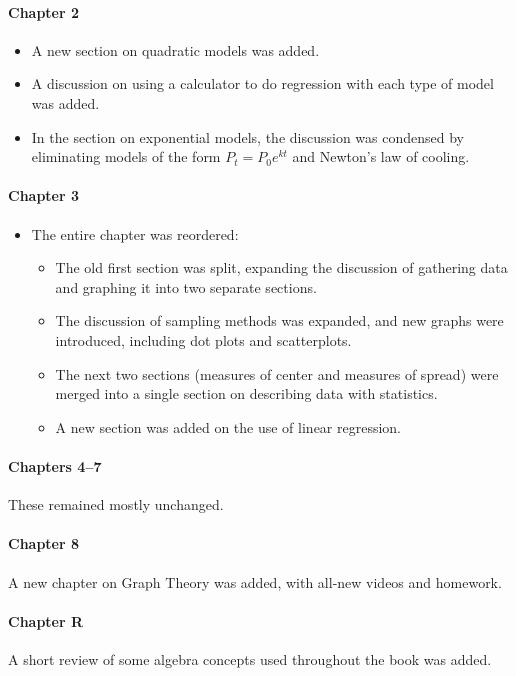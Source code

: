 \paragraph{Chapter 2}
\begin{itemize}
\item A new section on quadratic models was added.
\item A discussion on using a calculator to do regression with each type of model was added.
\item In the section on exponential models, the discussion was condensed by eliminating models of the form $P_t = P_0e^{kt}$ and Newton's law of cooling.
\end{itemize}

\paragraph{Chapter 3}
\begin{itemize}
\item The entire chapter was reordered:
\begin{itemize}
\item The old first section was split, expanding the discussion of gathering data and graphing it into two separate sections.
\item The discussion of sampling methods was expanded, and new graphs were introduced, including dot plots and scatterplots.
\item The next two sections (measures of center and measures of spread) were merged into a single section on describing data with statistics.
\item A new section was added on the use of linear regression.
\end{itemize}
\end{itemize}

\paragraph{Chapters 4--7} These remained mostly unchanged.

\paragraph{Chapter 8} A new chapter on Graph Theory was added, with all-new videos and homework.

\paragraph{Chapter R} A short review of some algebra concepts used throughout the book was added.





















